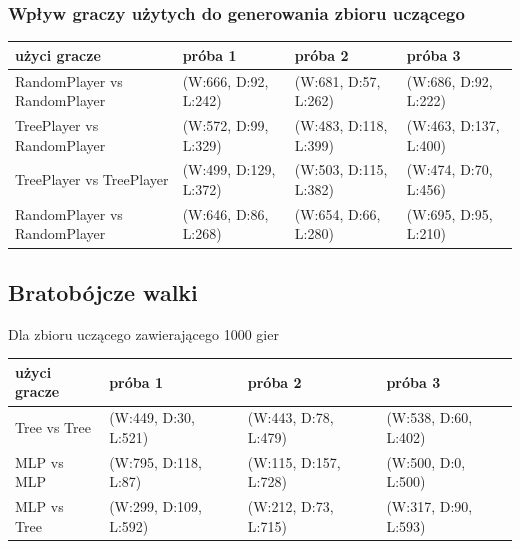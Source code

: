 \documentclass{article}
\begin{document}
\subsubsection{Wpływ graczy użytych do generowania zbioru uczącego}

\begin{center}
  \begin{tabular}{ | l | l | l | l | }
    \hline
    użyci gracze & próba 1 & próba 2 & próba 3 \\ \hline
    RandomPlayer vs RandomPlayer & (W:666, D:92, L:242) & (W:681, D:57, L:262) & (W:686, D:92, L:222) \\ \hline
    TreePlayer vs RandomPlayer & (W:572, D:99, L:329) & (W:483, D:118, L:399) & (W:463, D:137, L:400) \\ \hline
    TreePlayer vs TreePlayer & (W:499, D:129, L:372) & (W:503, D:115, L:382) & (W:474, D:70, L:456) \\ \hline
    RandomPlayer vs RandomPlayer & (W:646, D:86, L:268) & (W:654, D:66, L:280) & (W:695, D:95, L:210) \\ \hline
  \end{tabular}
\end{center}

\subsection{Bratobójcze walki}

Dla zbioru uczącego zawierającego 1000 gier

\begin{center}
  \begin{tabular}{ | l | l | l | l | }
    \hline
    użyci gracze & próba 1 & próba 2 & próba 3 \\ \hline
    Tree vs Tree & (W:449, D:30, L:521) & (W:443, D:78, L:479) & (W:538, D:60, L:402) \\ \hline
    MLP vs MLP & (W:795, D:118, L:87) & (W:115, D:157, L:728) & (W:500, D:0, L:500) \\ \hline
    MLP vs Tree & (W:299, D:109, L:592) & (W:212, D:73, L:715) & (W:317, D:90, L:593) \\ \hline
  \end{tabular}
\end{center}
\end{document}

